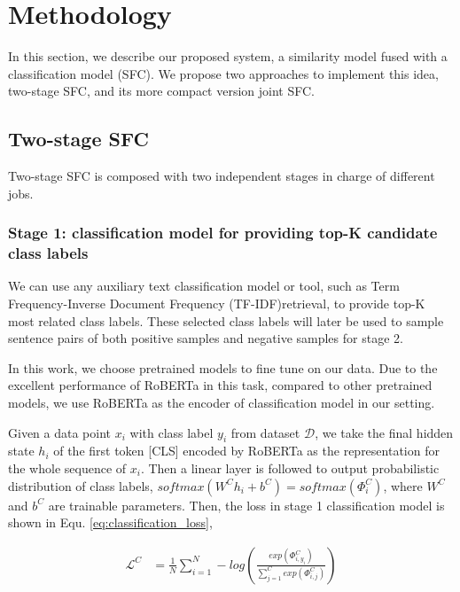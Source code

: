 \section{Methodology}
In  this section, we describe our proposed system, a similarity model fused with
a classification  model (SFC). We propose two approaches to implement this idea,
two-stage SFC, and its more compact version joint SFC.

\subsection{Two-stage SFC}

Two-stage   SFC  is  composed  with  two  independent stages  in  charge of
different  jobs. 

\subsubsection*{
  Stage 1: classification model for providing top-K candidate class labels
} 
We  can  use any auxiliary text classification model or tool,
such as Term Frequency-Inverse Document Frequency (TF-IDF)retrieval, to
provide  top-K  most  related  class  labels. These selected class labels will
later  be  used to sample sentence pairs of both positive samples and negative
samples  for  stage  2. 

In  this  work,  we  choose pretrained models to fine tune on our data.
Due to the excellent performance of RoBERTa in this task, compared to other pretrained
models, we use RoBERTa as the encoder of classification model in our setting.

Given   a   data   point   $x_{i}$  with  class  label  $y_{i}$  from  dataset
$\mathcal{D}$, we take the final hidden state $h_{i}$ of the first token [CLS]
encoded  by  RoBERTa  as the representation for the whole sequence of $x_{i}$.
Then  a linear layer is followed to output probabilistic distribution of class
labels,  $softmax(W^Ch_{i}+b^C)=softmax({\Phi}^C_{i})$,  where $W^C$ and $b^C$
are  trainable  parameters.  Then, the loss in stage 1 classification model is
shown in Equ. \ref{eq:classification_loss},


\begin{equation}
  \begin{aligned}
    \mathcal{L}^{C}&=\frac{1}{N}\sum_{i=1}^{N}-log(\frac{exp(\varPhi_{i,y_{i}}^C)}{\sum_{j=1}^{C}exp(\varPhi_{i,j}^C)}) \\
    \label{eq:classification_loss}
  \end{aligned}
\end{equation}

